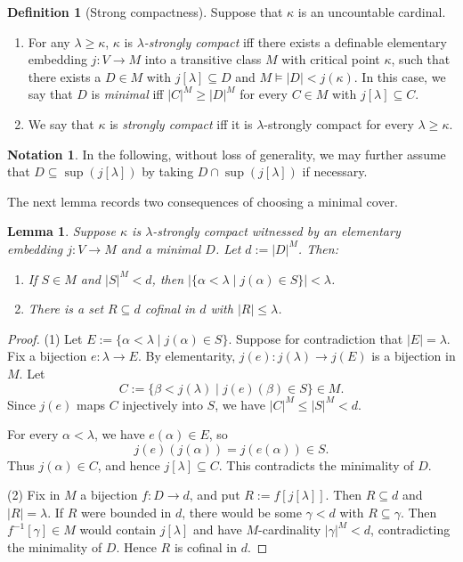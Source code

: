 \documentclass[10pt,a4paper]{amsart}
\newtheorem{lemma}[thm]{Lemma}
\theoremstyle{definition}
\newtheorem{defn}[thm]{Definition}
\newtheorem{notation}[thm]{Notation}
\theoremstyle{remark}
\renewcommand{\mid}{\mathrel{|}\allowbreak}
\begin{document}
\begin{defn}[Strong compactness]\label{dfine}
    Suppose that $\kappa$ is an uncountable cardinal.
    \begin{enumerate}
        \item For any $\lambda\ge\kappa$, $\kappa$ is \emph{$\lambda$-strongly compact} iff there exists a definable elementary embedding $j:V\rightarrow M$ into a transitive class $M$ with critical point $\kappa$,
              such that there exists a $D\in M$ with $j[\lambda]\subseteq D$ and $M\models |D|<j(\kappa)$.
              In this case, we say that $D$ is \emph{minimal} iff $|C|^M\ge|D|^M$ for every $C\in M$ with $j[\lambda]\subseteq C$.
        \item We say that $\kappa$ is \emph{strongly compact} iff it is $\lambda$-strongly compact for every $\lambda\ge\kappa$.
    \end{enumerate}
\end{defn}

\begin{notation}
    In the following, without loss of generality,
    we may further assume that $D\subseteq \sup(j[\lambda])$ by taking $D \cap \sup(j[\lambda])$ if necessary.
\end{notation}

The next lemma records two consequences of choosing a minimal cover.

\begin{lemma}\label{lpullback}
    Suppose $\kappa$ is $\lambda$-strongly compact witnessed by an elementary embedding $j:V\rightarrow M$ and a minimal $D$. Let $d:=|D|^M$. Then:
    \begin{enumerate}
        \item[(1)] If $S\in M$ and $|S|^M< d$, then $|\{\alpha<\lambda\mid j(\alpha)\in S\}|<\lambda$.
        \item[(2)] There is a set $R\subseteq d$ cofinal in $d$ with $|R|\le\lambda$.
    \end{enumerate}
\end{lemma}
\begin{proof}
    (1) Let $E:=\{\alpha<\lambda\mid j(\alpha)\in S\}$.
    Suppose for contradiction that $|E|=\lambda$.
    Fix a bijection $e:\lambda\rightarrow E$.
    By elementarity, $j(e):j(\lambda)\rightarrow j(E)$ is a bijection in $M$.
    Let
    $$C:=\{\beta<j(\lambda)\mid j(e)(\beta)\in S\}\in M.$$
    Since $j(e)$ maps $C$ injectively into $S$, we have $|C|^M\le|S|^M<d$.

    For every $\alpha<\lambda$, we have $e(\alpha)\in E$, so
    $$j(e)(j(\alpha))=j(e(\alpha))\in S.$$
    Thus $j(\alpha)\in C$, and hence $j[\lambda]\subseteq C$.
    This contradicts the minimality of $D$.

    (2) Fix in $M$ a bijection $f:D\rightarrow d$, and put $R:=f[j[\lambda]]$.
    Then $R\subseteq d$ and $|R|=\lambda$.
    If $R$ were bounded in $d$, there would be some $\gamma<d$ with $R\subseteq\gamma$.
    Then $f^{-1}[\gamma]\in M$ would contain $j[\lambda]$ and have $M$-cardinality
    $|\gamma|^M<d$, contradicting the minimality of $D$.
    Hence $R$ is cofinal in $d$.

\end{proof}
\end{document}
